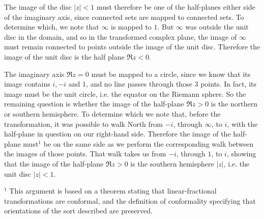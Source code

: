 \documentclass[12pt]{article}
\begin{document}
\begin{description}
  The image of the disc $|z| < 1$ must therefore be one of the half-planes
  either side of the imaginary axis, since connected sets are mapped to
  connected sets. To determine which, we note that $\infty$ is mapped to
  $1$. But $\infty$ was outside the unit disc in the domain, and so in the
  transformed complex plane, the image of $\infty$ must remain connected to
  points outside the image of the unit disc. Therefore the image of the unit
  disc is the half plane $\Re z < 0$.

  The imaginary axis $\Re z = 0$ must be mapped to a circle, since we know that
  its image contains $i, -i$ and $1$, and no line passes through those 3
  points. In fact, its image must be the unit circle, i.e. the equator on the
  Riemann sphere. So the remaining question is whether the image of the
  half-plane $\Re z > 0$ is the northern or southern hemisphere. To determine
  which we note that, before the transformation, it was possible to walk North
  from $-i$, through $\infty$, to $i$, with the half-plane in question on our
  right-hand side. Therefore the image of the half-plane must$^1$ be on the
  same side as we perform the corresponding walk between the images of those
  points. That walk takes us from $-i$, through $1$, to $i$, showing that the
  image of the half-plane $\Re z > 0$ is the southern hemisphere $|z|$,
  i.e. the unit disc $|z| < 1$.

  $^1$ This argument is based on a theorem stating that linear-fractional
  transformations are conformal, and the definition of conformality specifying
  that orientations of the sort described are preserved.


\end{description}
\end{document}
